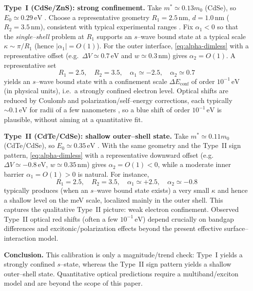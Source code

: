 \documentclass[a4paper,11pt]{article}
\numberwithin{equation}{section}
\theoremstyle{definition}
\theoremstyle{remark}
\begin{document}
\medskip
\noindent
\textbf{Type~I (CdSe/ZnS): strong confinement.}
Take $m^*\simeq0.13m_0$ (CdSe), so $E_0\simeq0.29\,\mathrm{eV}$ \cite{Madelung2004}.
Choose a representative geometry $R_1=2.5\,\mathrm{nm}$, $d=1.0\,\mathrm{nm}$ ($R_2=3.5\,\mathrm{nm}$),
consistent with typical experimental ranges \cite{HinesGuyotSionnest1996,OronKazesBanin2007,Dabbousi1997}.
Fix $\alpha_1<0$ so that the \emph{single--shell} problem at $R_1$ supports an $s$--wave bound state
at a typical scale $\kappa\sim\pi/R_1$ (hence $|\alpha_1|=O(1)$).
For the outer interface, \eqref{eq:alpha-dimless} with a representative offset
(e.g.\ $\Delta V\simeq0.7\,\mathrm{eV}$ and $w\simeq0.3\,\mathrm{nm}$) gives $\alpha_2=O(1)$.
A representative set
$$
R_1=2.5,\quad R_2=3.5,\quad \alpha_1\simeq-2.5,\quad \alpha_2\simeq0.7
$$
yields an $s$--wave bound state with a confinement scale $\Delta E_{\mathrm{conf}}$
of order $10^{-1}\,\mathrm{eV}$ (in physical units), i.e.\ a strongly confined electron level.
Optical shifts are reduced by Coulomb and polarization/self--energy corrections, each typically
$\sim0.1\,\mathrm{eV}$ for radii of a few nanometers \cite{Brus1984}, so a blue shift of order
$10^{-1}\,\mathrm{eV}$ is plausible, without aiming at a quantitative fit.

\medskip
\noindent
\textbf{Type~II (CdTe/CdSe): shallow outer--shell state.}
Take $m^*\simeq0.11m_0$ (CdTe/CdSe), so $E_0\simeq0.35\,\mathrm{eV}$ \cite{Madelung2004}.
With the same geometry and the Type~II sign pattern, \eqref{eq:alpha-dimless} with a representative
downward offset (e.g.\ $\Delta V\simeq-0.8\,\mathrm{eV}$, $w\simeq0.35\,\mathrm{nm}$) gives $\alpha_2=O(1)<0$,
while a moderate inner barrier $\alpha_1=O(1)>0$ is natural.
For instance,
$$
R_1=2.5,\quad R_2=3.5,\quad \alpha_1\simeq+2.5,\quad \alpha_2\simeq-0.8
$$
typically produces (when an $s$--wave bound state exists) a very small $\kappa$ and hence a shallow level
on the meV scale, localized mainly in the outer shell.
This captures the qualitative Type~II picture: weak electron confinement.
Observed Type~II optical red shifts (often a few $10^{-1}\,\mathrm{eV}$) depend crucially on bandgap
differences and excitonic/polarization effects beyond the present effective surface--interaction model.

\medskip
\noindent
\textbf{Conclusion.}
This calibration is only a magnitude/trend check: Type~I yields a strongly confined $s$--state,
whereas the Type~II sign pattern yields a shallow outer--shell state.
Quantitative optical predictions require a multiband/exciton model and are beyond the scope of this paper.
\end{document}
